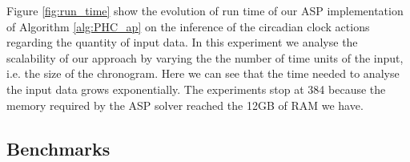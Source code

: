 Figure \ref{fig:run_time} show the evolution of run time of our ASP implementation of Algorithm \ref{alg:PHC_ap} on the inference of the circadian clock actions regarding the quantity of input data.
In this experiment we analyse the scalability of our approach by varying the the number of time units of the input, i.e. the size of the chronogram.
Here we can see that the time needed to analyse the input data grows exponentially.
The experiments stop at 384 because the memory required by the ASP solver reached the 12GB of RAM we have.

\subsection{Benchmarks}

